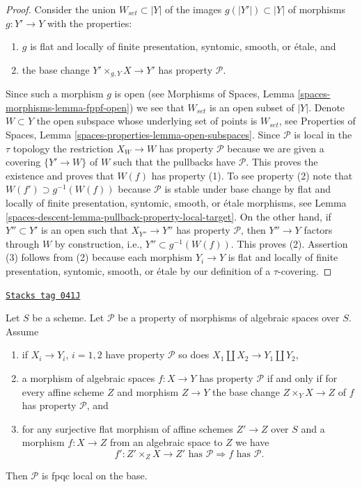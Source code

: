 \begin{proof}
Consider the union $W_{set} \subset |Y|$ of the images
$g(|Y'|) \subset |Y|$ of morphisms $g : Y' \to Y$ with the properties:
\begin{enumerate}
\item $g$ is flat and locally of finite presentation, syntomic,
smooth, or \'etale, and
\item the base change $Y' \times_{g, Y} X \to Y'$ has property
$\mathcal{P}$.
\end{enumerate}
Since such a morphism $g$ is open (see
Morphisms of Spaces, Lemma \ref{spaces-morphisms-lemma-fppf-open})
we see that $W_{set}$ is an open subset of $|Y|$. Denote $W \subset Y$
the open subspace whose underlying set of points is $W_{set}$, see
Properties of Spaces, Lemma \ref{spaces-properties-lemma-open-subspaces}.
Since $\mathcal{P}$ is local in the $\tau$ topology the restriction
$X_W \to W$ has property $\mathcal{P}$ because we are given a covering
$\{Y' \to W\}$ of $W$ such that the pullbacks have $\mathcal{P}$.
This proves the existence and proves that $W(f)$ has property (1).
To see property (2) note that $W(f') \supset g^{-1}(W(f))$ because
$\mathcal{P}$ is stable under base change by flat and locally of finite
presentation, syntomic, smooth, or \'etale morphisms, see
Lemma \ref{spaces-descent-lemma-pullback-property-local-target}.
On the other hand, if $Y'' \subset Y'$ is an open such that
$X_{Y''} \to Y''$ has property $\mathcal{P}$, then $Y'' \to Y$ factors
through $W$ by construction, i.e., $Y'' \subset g^{-1}(W(f))$. This
proves (2). Assertion (3) follows from (2) because each morphism
$Y_i \to Y$ is flat and locally of finite presentation, syntomic,
smooth, or \'etale by our definition of a $\tau$-covering.
\end{proof}

\begin{lemma}
\label{spaces-descent-lemma-descending-properties-morphisms}
\href{https://stacks.math.columbia.edu/tag/041J}{\texttt{Stacks tag 041J}}

Let $S$ be a scheme. Let $\mathcal{P}$ be a property of morphisms of
algebraic spaces over $S$. Assume
\begin{enumerate}
\item if $X_i \to Y_i$, $i = 1, 2$ have property $\mathcal{P}$ so
does $X_1 \amalg X_2 \to Y_1 \amalg Y_2$,
\item a morphism of algebraic spaces $f : X \to Y$ has property
$\mathcal{P}$ if and only if for every affine scheme $Z$ and
morphism $Z \to Y$ the base change $Z \times_Y X \to Z$ of $f$
has property $\mathcal{P}$, and
\item for any surjective flat morphism of affine schemes
$Z' \to Z$ over $S$ and a morphism $f : X \to Z$ from an algebraic space
to $Z$ we have
$$
f' : Z' \times_Z X \to Z'\text{ has }\mathcal{P}
\Rightarrow
f\text{ has }\mathcal{P}.
$$
\end{enumerate}
Then $\mathcal{P}$ is fpqc local on the base.
\end{lemma}

